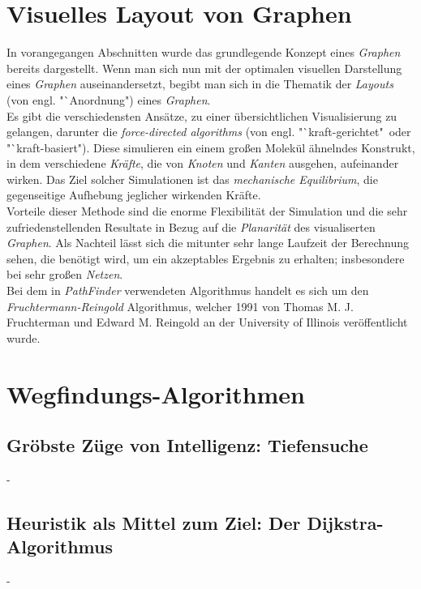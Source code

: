 \documentclass[12pt]{article}
\begin{document}
\section{Visuelles Layout von Graphen}
\label{sec:layout}
In vorangegangen Abschnitten wurde das grundlegende Konzept eines \textit{Graphen} bereits dargestellt. Wenn man sich nun mit der optimalen visuellen Darstellung eines \textit{Graphen} auseinandersetzt, begibt man sich in die Thematik der \textit{Layouts} (von engl. "`Anordnung") eines \textit{Graphen}.
\\ 
Es gibt die verschiedensten Ansätze, zu einer übersichtlichen Visualisierung zu gelangen, darunter die \textit{force-directed algorithms} (von engl. "`kraft-gerichtet"\ oder "`kraft-basiert")\cite{force-directed}. Diese simulieren ein einem großen Molekül ähnelndes Konstrukt, in dem verschiedene \textit{Kräfte}, die von \textit{Knoten} und \textit{Kanten} ausgehen, aufeinander wirken. Das Ziel solcher Simulationen ist das \textit{mechanische Equilibrium}, die gegenseitige Aufhebung jeglicher wirkenden Kräfte.\\
Vorteile dieser Methode sind die enorme Flexibilität der Simulation und die sehr zufriedenstellenden Resultate in Bezug auf die \textit{Planarität} des visualiserten \textit{Graphen}. Als Nachteil lässt sich die mitunter sehr lange Laufzeit der Berechnung sehen, die benötigt wird, um ein akzeptables Ergebnis zu erhalten; insbesondere bei sehr großen \textit{Netzen}.
\\
Bei dem in \textit{PathFinder} verwendeten Algorithmus handelt es sich um den \textit{Fruchtermann-Reingold} Algorithmus, welcher 1991 von Thomas M. J. Fruchterman und Edward M. Reingold an der University of Illinois veröffentlicht wurde.\cite{fruchterman}
\newpage

\section{Wegfindungs-Algorithmen}
\newpage

\subsection{Gröbste Züge von Intelligenz: Tiefensuche}
\newpage
-
\newpage

\subsection{Heuristik als Mittel zum Ziel: Der Dijkstra-Algorithmus}
\newpage
-
\newpage
\end{document}
